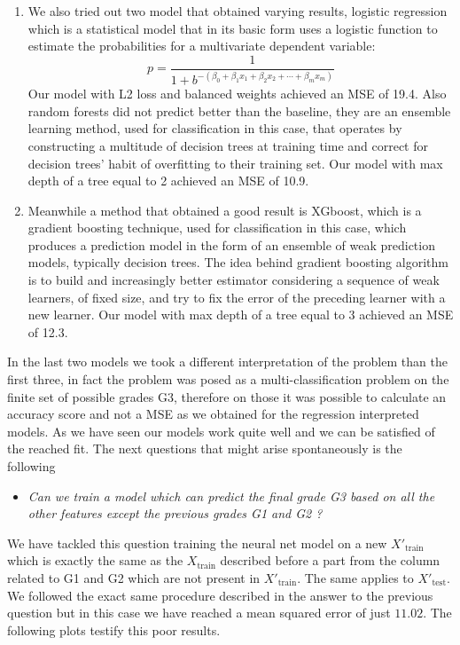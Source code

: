 \documentclass[a4paper, 11pt]{report}
\theoremstyle{definition}
\numberwithin{equation}{section}		%
\numberwithin{table}{section}				%
\begin{document}
\begin{enumerate}
\item We also tried out two model that obtained varying results, logistic regression which is a statistical model that in its basic form uses a logistic function to estimate the probabilities for a multivariate dependent variable: $$p=\frac{1}{1+b^{-\left(\beta_{0}+\beta_{1} x_{1}+\beta_{2} x_{2}+\cdots+\beta_{m} x_{m}\right)}}$$
Our model with L2 loss and balanced weights achieved an MSE of 19.4. Also random forests did not predict better than the baseline, they are an ensemble learning method, used for classification in this case, that operates by constructing a multitude of decision trees at training time and correct for decision trees' habit of overfitting to their training set. Our model with max depth of a tree equal to 2 achieved an MSE of 10.9.
\item Meanwhile a method that obtained a good result is XGboost, which is a gradient boosting technique, used for classification in this case, which produces a prediction model in the form of an ensemble of weak prediction models, typically decision trees. The idea behind gradient boosting algorithm is to build and increasingly better estimator considering a sequence of weak learners, of fixed size, and try to fix the error of the preceding learner with a new learner. Our model with max depth of a tree equal to 3 achieved an MSE of 12.3.
\end{enumerate}
In the last two models we took a different interpretation of the problem than the first three, in fact the problem was posed as a multi-classification problem on the finite set of possible grades G3, therefore on those it was possible to calculate an accuracy score and not a MSE as we obtained for the regression interpreted models.
As we have seen our models work quite well and we can be satisfied of the reached fit. The next questions that might arise spontaneously is the following
\begin{itemize}
    \item \textit{Can we train a model which can predict the final grade G3 based on all the other features except the previous grades G1 and G2 ?}
\end{itemize}
We have tackled this question training the neural net model on a new $X'_{\text{train}}$ which is exactly the same as the $X_{\text{train}}$ described before a part from the column related to G1 and G2 which are not present in $X'_{\text{train}}$. The same applies to $X'_{\text{test}}$. We followed the exact same procedure described in the answer to the previous question but in this case we have reached a mean squared error of just $11.02$. The following plots testify this poor results.
\end{document}
